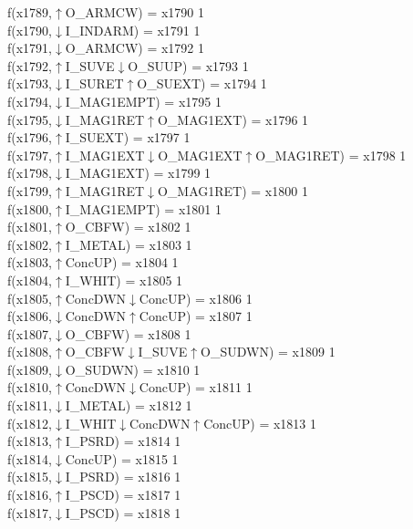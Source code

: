 f(x1789,$\uparrow$O\_ARMCW) = x1790 {1} \\
f(x1790,$\downarrow$I\_INDARM) = x1791 {1} \\
f(x1791,$\downarrow$O\_ARMCW) = x1792 {1} \\
f(x1792,$\uparrow$I\_SUVE$\downarrow$O\_SUUP) = x1793 {1} \\
f(x1793,$\downarrow$I\_SURET$\uparrow$O\_SUEXT) = x1794 {1} \\
f(x1794,$\downarrow$I\_MAG1EMPT) = x1795 {1} \\
f(x1795,$\downarrow$I\_MAG1RET$\uparrow$O\_MAG1EXT) = x1796 {1} \\
f(x1796,$\uparrow$I\_SUEXT) = x1797 {1} \\
f(x1797,$\uparrow$I\_MAG1EXT$\downarrow$O\_MAG1EXT$\uparrow$O\_MAG1RET) = x1798 {1} \\
f(x1798,$\downarrow$I\_MAG1EXT) = x1799 {1} \\
f(x1799,$\uparrow$I\_MAG1RET$\downarrow$O\_MAG1RET) = x1800 {1} \\
f(x1800,$\uparrow$I\_MAG1EMPT) = x1801 {1} \\
f(x1801,$\uparrow$O\_CBFW) = x1802 {1} \\
f(x1802,$\uparrow$I\_METAL) = x1803 {1} \\
f(x1803,$\uparrow$ConcUP) = x1804 {1} \\
f(x1804,$\uparrow$I\_WHIT) = x1805 {1} \\
f(x1805,$\uparrow$ConcDWN$\downarrow$ConcUP) = x1806 {1} \\
f(x1806,$\downarrow$ConcDWN$\uparrow$ConcUP) = x1807 {1} \\
f(x1807,$\downarrow$O\_CBFW) = x1808 {1} \\
f(x1808,$\uparrow$O\_CBFW$\downarrow$I\_SUVE$\uparrow$O\_SUDWN) = x1809 {1} \\
f(x1809,$\downarrow$O\_SUDWN) = x1810 {1} \\
f(x1810,$\uparrow$ConcDWN$\downarrow$ConcUP) = x1811 {1} \\
f(x1811,$\downarrow$I\_METAL) = x1812 {1} \\
f(x1812,$\downarrow$I\_WHIT$\downarrow$ConcDWN$\uparrow$ConcUP) = x1813 {1} \\
f(x1813,$\uparrow$I\_PSRD) = x1814 {1} \\
f(x1814,$\downarrow$ConcUP) = x1815 {1} \\
f(x1815,$\downarrow$I\_PSRD) = x1816 {1} \\
f(x1816,$\uparrow$I\_PSCD) = x1817 {1} \\
f(x1817,$\downarrow$I\_PSCD) = x1818 {1} \\
